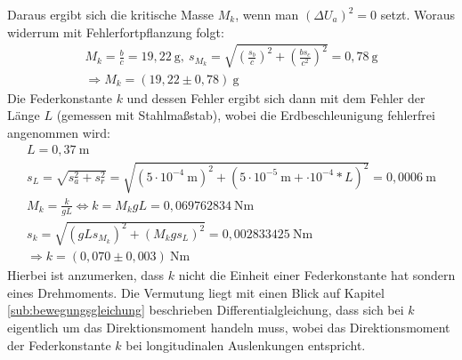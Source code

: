 Daraus ergibt sich die kritische Masse $M_k$, wenn man $(\Delta U_a)^2=0$ setzt. Woraus widerrum mit Fehlerfortpflanzung folgt:
\begin{gather}
    M_k = \frac{b}{c} = 19,22~\text {g},~
    s_{M_k} = \sqrt{\left(\frac{s_b}{c}\right)^2+\left(\frac{b s_c}{c^2}\right)^2}=0,78~\text{g}\\[0,5cm]
    \Rightarrow\boxed{M_k = (19,22 \pm 0,78)~\text{g}}
\end{gather}
Die Federkonstante $k$ und dessen Fehler ergibt sich dann mit dem Fehler der Länge $L$ (gemessen mit Stahlmaßstab), wobei die Erdbeschleunigung fehlerfrei angenommen wird:
\begin{gather}
    L = 0,37~\text{m}\\
    s_L=\sqrt{s_a^2+s_r^2}=\sqrt{(5\cdot 10^{-4}~\text{m})^2+(5\cdot 10^{-5}~\text{m}+\cdot 10^{-4}*L)^2} = 0,0006~\text{m}\\
    M_k = \frac{k}{gL} \Leftrightarrow k = M_k g L = 0,069762834~\text{Nm}\\
    s_k = \sqrt{(gLs_{M_k})^2+(M_kgs_L)^2} = 0,002833425~\text{Nm}\\[0,5cm]
    \Rightarrow\boxed{k = (0,070 \pm 0,003)~\text{Nm}}
\end{gather}
Hierbei ist anzumerken, dass $k$ nicht die Einheit einer Federkonstante hat sondern eines Drehmoments. Die Vermutung liegt mit einen Blick auf Kapitel \ref{sub:bewegungsgleichung} beschrieben Differentialgleichung, dass sich bei $k$ eigentlich um das Direktionsmoment handeln muss, wobei das Direktionsmoment der Federkonstante $k$ bei longitudinalen Auslenkungen entspricht.

